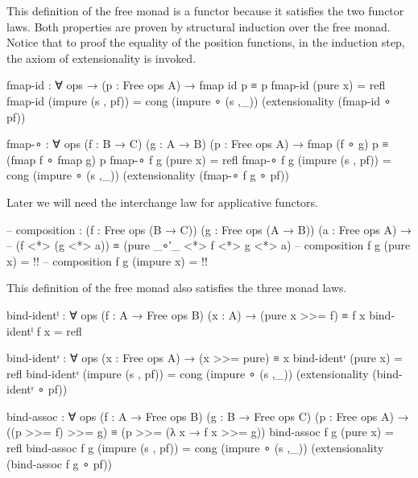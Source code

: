This definition of the free monad is a functor because it satisfies the two
functor laws.
Both properties are proven by structural induction over the free monad.
Notice that to proof the equality of the position functions, in the induction
step, the axiom of extensionality is invoked.

\begin{code}[number=fmap-id]
fmap-id : ∀ {ops} → (p : Free ops A) → fmap id p ≡ p
fmap-id (pure x)           = refl
fmap-id (impure (s , pf))  = cong (impure ∘ (s ,_)) (extensionality (fmap-id ∘ pf))
\end{code}
\begin{code}[number=fmap-comp]
fmap-∘ : ∀ {ops} (f : B → C) (g : A → B) (p : Free ops A) →
         fmap (f ∘ g) p ≡ (fmap f ∘ fmap g) p
fmap-∘ f g (pure x)           = refl
fmap-∘ f g (impure (s , pf))  = cong (impure ∘ (s ,_)) (extensionality (fmap-∘ f g ∘ pf))
\end{code}
Later we will need the interchange law for applicative functors.

\begin{code}[hide]
-- composition : (f : Free ops (B → C)) (g : Free ops (A → B)) (a : Free ops A) →
--    (f <*> (g <*> a)) ≡ (pure _∘′_ <*> f <*> g <*> a)
-- composition f g (pure x) = {!!}
-- composition f g (impure x) = {!!}
\end{code}
This definition of the free monad also satisfies the three monad laws.

\begin{code}[number=bind-ident-left]
bind-identˡ : ∀ {ops} (f : A → Free ops B) (x : A) → (pure x >>= f) ≡ f x
bind-identˡ f x = refl
\end{code}
\begin{code}[number=bind-ident-right]
bind-identʳ : ∀ {ops} (x : Free ops A) → (x >>= pure) ≡ x
bind-identʳ (pure x)           = refl
bind-identʳ (impure (s , pf))  = cong (impure ∘ (s ,_)) (extensionality (bind-identʳ ∘ pf))
\end{code}
\begin{code}[number=bind-assoc]
bind-assoc : ∀ {ops} (f : A → Free ops B) (g : B → Free ops C) (p : Free ops A) →
             ((p >>= f) >>= g) ≡ (p >>= (λ x → f x >>= g))
bind-assoc f g (pure x)           = refl
bind-assoc f g (impure (s , pf))  = cong (impure ∘ (s ,_)) (extensionality (bind-assoc f g ∘ pf))
\end{code}

